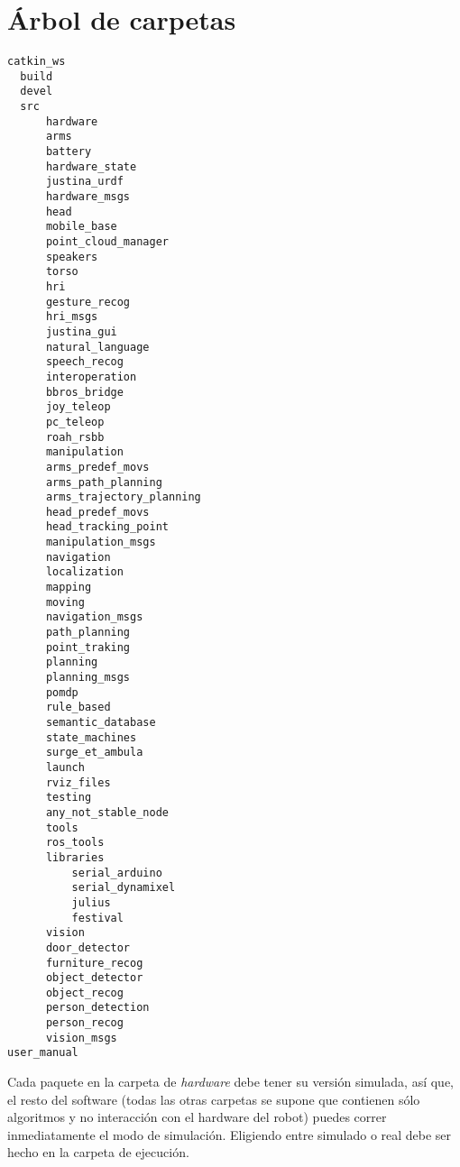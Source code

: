 \documentclass[user_manual.tex]{subfiles}
\begin{document}
\section{Árbol de carpetas}
\begin{verbatim}
catkin_ws
  build
  devel
  src
      hardware
	  arms
	  battery
	  hardware_state
	  justina_urdf
	  hardware_msgs
	  head
	  mobile_base
	  point_cloud_manager
	  speakers
	  torso
      hri
	  gesture_recog
	  hri_msgs
	  justina_gui
	  natural_language
	  speech_recog
      interoperation
	  bbros_bridge
	  joy_teleop
	  pc_teleop
	  roah_rsbb
      manipulation
	  arms_predef_movs
	  arms_path_planning
	  arms_trajectory_planning
	  head_predef_movs
	  head_tracking_point
	  manipulation_msgs
      navigation
	  localization
	  mapping
	  moving
	  navigation_msgs
	  path_planning
	  point_traking
      planning
	  planning_msgs
	  pomdp
	  rule_based
	  semantic_database
	  state_machines
      surge_et_ambula
	  launch
	  rviz_files
      testing
	  any_not_stable_node
      tools
	  ros_tools
	  libraries
	      serial_arduino
	      serial_dynamixel
	      julius
	      festival
      vision
	  door_detector
	  furniture_recog
	  object_detector
	  object_recog
	  person_detection
	  person_recog
	  vision_msgs
user_manual
\end{verbatim}
Cada paquete en la carpeta de \textit{hardware} debe tener su versión simulada, así que, el resto del 
software (todas las otras carpetas se supone que contienen sólo algoritmos y no interacción con el 
hardware del robot) puedes correr inmediatamente el modo de simulación. Eligiendo entre simulado o 
real debe ser hecho en la carpeta de ejecución.
\end{document}
